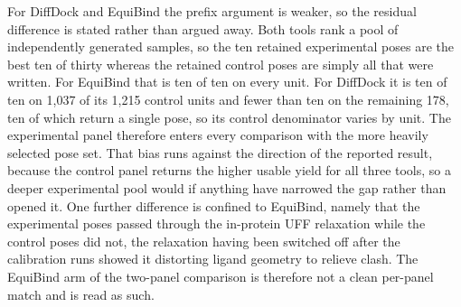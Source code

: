 For DiffDock and EquiBind the prefix argument is weaker, so the residual difference is stated rather than argued away. Both tools rank a pool of independently generated samples, so the ten retained experimental poses are the best ten of thirty whereas the retained control poses are simply all that were written. For EquiBind that is ten of ten on every unit. For DiffDock it is ten of ten on 1,037 of its 1,215 control units and fewer than ten on the remaining 178, ten of which return a single pose, so its control denominator varies by unit. The experimental panel therefore enters every comparison with the more heavily selected pose set. That bias runs against the direction of the reported result, because the control panel returns the higher usable yield for all three tools, so a deeper experimental pool would if anything have narrowed the gap rather than opened it. One further difference is confined to EquiBind, namely that the experimental poses passed through the in-protein UFF relaxation while the control poses did not, the relaxation having been switched off after the calibration runs showed it distorting ligand geometry to relieve clash. The EquiBind arm of the two-panel comparison is therefore not a clean per-panel match and is read as such.

